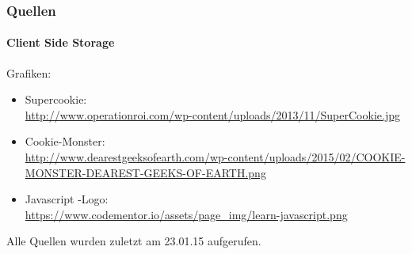 \begin{frame}
\frametitle{Quellen}
\framesubtitle{Client Side Storage}

Grafiken:
\begin{itemize}
	\item Supercookie: \\  {\small \url{http://www.operationroi.com/wp-content/uploads/2013/11/SuperCookie.jpg}}
	\item Cookie-Monster: \\
	{\small \url{http://www.dearestgeeksofearth.com/wp-content/uploads/2015/02/COOKIE-MONSTER-DEAREST-GEEKS-OF-EARTH.png} }
	\item Javascript -Logo: \\
	{\small \url{https://www.codementor.io/assets/page_img/learn-javascript.png}}
	
\end{itemize}
	Alle Quellen wurden zuletzt am 23.01.15 aufgerufen.

\end{frame}
